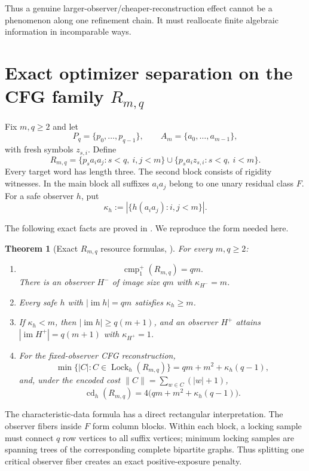 \documentclass[11pt]{article}
\newtheorem{theorem}{Theorem}[section]
\theoremstyle{definition}
\theoremstyle{remark}
\newcommand{\im}{\operatorname{im}}
\newcommand{\cmp}{\operatorname{cmp}}
\newcommand{\cd}{\operatorname{cd}}
\newcommand{\Lock}{\operatorname{Lock}}
\begin{document}
Thus a genuine larger-observer/cheaper-reconstruction effect cannot be a
phenomenon along one refinement chain.  It must reallocate finite algebraic
information in incomparable ways.

\section{Exact optimizer separation on the CFG family $R_{m,q}$}
\label{sec:R}

Fix $m,q\ge2$ and let
\[
 P_q=\{p_0,\ldots,p_{q-1}\},\qquad
 A_m=\{a_0,\ldots,a_{m-1}\},
\]
with fresh symbols $z_{s,i}$.  Define
\[
 R_{m,q}
 =
 \{p_sa_i a_j:s<q,\ i,j<m\}
 \cup
 \{p_sa_i z_{s,i}:s<q,\ i<m\}.
\]
Every target word has length three.  The second block consists of rigidity
witnesses.  In the main block all suffixes $a_i a_j$ belong to one unary
residual class $F$.  For a safe observer $h$, put
\[
 \kappa_h
 :=
 |\{h(a_i a_j):i,j<m\}|.
\]

The following exact facts are proved in \cite{KuriyamaOFET}.  We reproduce the
form needed here.

\begin{theorem}[Exact $R_{m,q}$ resource formulas, \cite{KuriyamaOFET}]
\label{thm:R-input}
For every $m,q\ge2$:
\begin{enumerate}[label=(\roman*),leftmargin=*]
\item
\[
 \cmp_1^+(R_{m,q})=qm.
\]
There is an observer $H^-$ of image size $qm$ with $\kappa_{H^-}=m$.
\item Every safe $h$ with $|\im h|=qm$ satisfies $\kappa_h\ge m$.
\item If $\kappa_h<m$, then $|\im h|\ge q(m+1)$, and an observer $H^+$
      attains $|\im H^+|=q(m+1)$ with $\kappa_{H^+}=1$.
\item For the fixed-observer CFG reconstruction,
\[
 \min\{|C|:C\in\Lock_h(R_{m,q})\}
 =qm+m^2+\kappa_h(q-1),
\]
and, under the encoded cost $\|C\|=\sum_{w\in C}(|w|+1)$,
\[
 \boxed{
 \cd_h(R_{m,q})
 =4\bigl(qm+m^2+\kappa_h(q-1)\bigr).
 }
\]
\end{enumerate}
\end{theorem}

The characteristic-data formula has a direct rectangular interpretation.  The
observer fibers inside $F$ form column blocks.  Within each block, a locking
sample must connect $q$ row vertices to all suffix vertices; minimum locking
samples are spanning trees of the corresponding complete bipartite graphs.
Thus splitting one critical observer fiber creates an exact positive-exposure
penalty.
\end{document}
